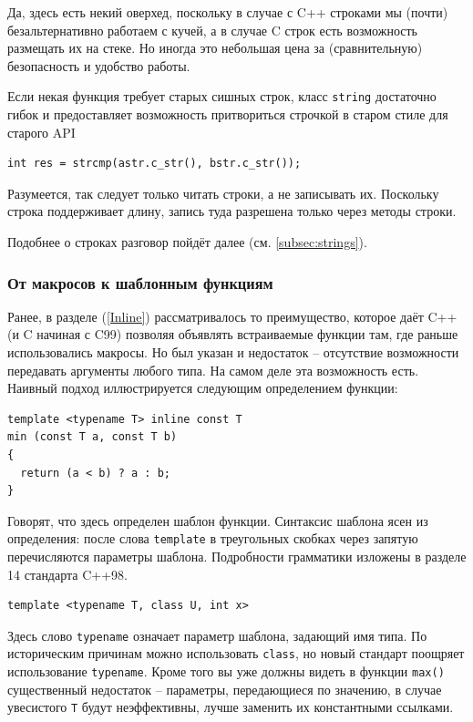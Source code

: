 \documentclass[a4paper,12pt,oneside]{article}
\begin{document}
Да, здесь есть некий оверхед, поскольку в случае с C++ строками мы (почти) безальтернативно работаем с кучей, а в случае C строк есть возможность размещать их на стеке. Но иногда это небольшая цена за (сравнительную) безопасность и удобство работы.

Если некая функция требует старых сишных строк, класс \lstinline!string! достаточно гибок и предоставляет возможность притвориться строчкой в старом стиле для старого API

\begin{lstlisting}
int res = strcmp(astr.c_str(), bstr.c_str());
\end{lstlisting}

Разумеется, так следует только читать строки, а не записывать их. Поскольку строка поддерживает длину, запись туда разрешена только через методы строки.

Подобнее о строках разговор пойдёт далее (см. \ref{subsec:strings}).

\subsubsection{От макросов к шаблонным функциям}\label{FunctionTemplate}

Ранее, в разделе (\ref{Inline}) рассматривалось то преимущество, которое даёт C++ (и C начиная с C99) позволяя объявлять встраиваемые функции там, где раньше использовались макросы. Но был указан и недостаток -- отсутствие возможности передавать аргументы любого типа. На самом деле эта возможность есть. Наивный подход иллюстрируется следующим определением функции:

\begin{lstlisting}
template <typename T> inline const T
min (const T a, const T b)
{
  return (a < b) ? a : b;
}
\end{lstlisting}

Говорят, что здесь определен шаблон функции. Синтаксис шаблона ясен из определения: после слова \lstinline!template! в треугольных скобках через запятую перечисляются параметры шаблона. Подробности грамматики изложены в разделе 14 стандарта C++98.

\begin{lstlisting}
template <typename T, class U, int x>
\end{lstlisting}

Здесь слово \lstinline!typename! означает параметр шаблона, задающий имя типа. По историческим причинам можно использовать \lstinline!class!, но новый стандарт поощряет использование \lstinline!typename!. Кроме того вы уже должны видеть в функции \lstinline!max()! существенный недостаток – параметры, передающиеся по значению, в случае увесистого \lstinline!T! будут неэффективны, лучше заменить их константными ссылками.
\end{document}
